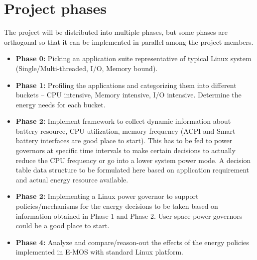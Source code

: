\section{Project phases}\label{sec:plan}
The project will be distributed into multiple phases, but some phases are 
orthogonal so that it can be implemented in parallel among the project members.

\begin{itemize}
\item \textbf{Phase 0:} Picking an application suite representative of typical Linux system (Single/Multi-threaded, I/O, Memory bound).  
\item \textbf{Phase 1:} Profiling the applications and categorizing them into different buckets -- CPU intensive, Memory intensive, I/O intensive. Determine the energy needs for each bucket.
\item \textbf{Phase 2:} Implement framework to collect dynamic information about battery resource, CPU utilization, memory frequency (ACPI and Smart battery interfaces are good place to start). This has to be fed to power governors at specific time intervals to make certain decisions to actually reduce the CPU frequency or go into a lower system power mode. A decision table data structure to be formulated here based on application requirement and actual energy resource available. 
\item \textbf{Phase 2:} Implementing a Linux power governor to support policies/mechanisms for the energy decisions to be taken based on information obtained in Phase 1 and Phase 2. User-space power governors could be a good place to start.  
\item \textbf{Phase 4:} Analyze and compare/reason-out the effects of the energy policies implemented in E-MOS with standard Linux platform. 
\end{itemize}
